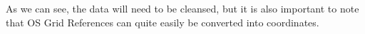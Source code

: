 \documentclass[11pt]{article}
\begin{document}

As we can see, the data will need to be cleansed, but it is also
important to note that OS Grid References can quite easily be converted
into coordinates.
\end{document}
